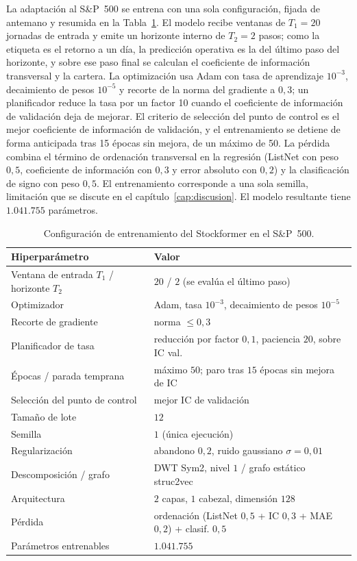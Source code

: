 La adaptación al S\&P~500 se entrena con una sola configuración, fijada de antemano y
resumida en la Tabla~\ref{tab:train-config}. El modelo recibe ventanas de $T_1=20$
jornadas de entrada y emite un horizonte interno de $T_2=2$ pasos; como la etiqueta es el
retorno a un día, la predicción operativa es la del último paso del horizonte, y sobre ese
paso final se calculan el coeficiente de información transversal y la cartera. La
optimización usa Adam con tasa de aprendizaje $10^{-3}$, decaimiento de pesos $10^{-5}$ y
recorte de la norma del gradiente a $0{,}3$; un planificador reduce la tasa por un factor
10 cuando el coeficiente de información de validación deja de mejorar. El criterio de
selección del punto de control es el mejor coeficiente de información de validación, y el
entrenamiento se detiene de forma anticipada tras 15 épocas sin mejora, de un máximo de
50. La pérdida combina el término de ordenación transversal en la regresión (ListNet con
peso $0{,}5$, coeficiente de información con $0{,}3$ y error absoluto con $0{,}2$) y la
clasificación de signo con peso $0{,}5$. El entrenamiento corresponde a una sola semilla,
limitación que se discute en el
capítulo~\ref{cap:discusion}. El modelo resultante tiene $1.041.755$ parámetros.

\begin{table}[htbp]
\centering
\caption{Configuración de entrenamiento del Stockformer en el S\&P~500.}
\label{tab:train-config}
\small
\begin{tabular}{ll}
\toprule
Hiperparámetro & Valor \\
\midrule
Ventana de entrada $T_1$ / horizonte $T_2$ & $20$ / $2$ (se evalúa el último paso) \\
Optimizador & Adam, tasa $10^{-3}$, decaimiento de pesos $10^{-5}$ \\
Recorte de gradiente & norma $\le 0{,}3$ \\
Planificador de tasa & reducción por factor $0{,}1$, paciencia $20$, sobre IC val. \\
Épocas / parada temprana & máximo $50$; paro tras $15$ épocas sin mejora de IC \\
Selección del punto de control & mejor IC de validación \\
Tamaño de lote & $12$ \\
Semilla & $1$ (única ejecución) \\
Regularización & abandono $0{,}2$, ruido gaussiano $\sigma=0{,}01$ \\
Descomposición / grafo & DWT Sym2, nivel $1$ / grafo estático struc2vec \\
Arquitectura & $2$ capas, $1$ cabezal, dimensión $128$ \\
Pérdida & ordenación (ListNet $0{,}5$ + IC $0{,}3$ + MAE $0{,}2$) + clasif. $0{,}5$ \\
Parámetros entrenables & $1.041.755$ \\
\bottomrule
\end{tabular}
\end{table}

